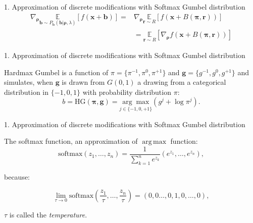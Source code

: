 \documentclass[10pt]{beamer}
\renewcommand{\vec}[1]{\mathbf{#1}}
\DeclareMathOperator*{\argmax}{arg\,max}
\begin{document}
\begin{frame}{1. Approximation of discrete modifications with Softmax Gumbel distribution}
    \begin{equation}
    \begin{aligned}
    \nabla_{\bm{\rho}} \underset{\vec{b}\sim P_\vec{b}\left(\vec{b} | \bm{\rho}, \lambda\right)}{\mathbb{E}}\left[f\left(\vec{x}+\vec{b}\right)\right] = 
    & \nabla_{\bm{\rho}} \underset{\vec{r} \sim R}{\mathbb{E}}[f(\vec{x}+B(\bm{\pi},\vec{r}))]  \\
    &  = \underset{\vec{r} \sim R}{\mathbb{E}}\left[ \nabla_{\bm{\rho}}  f(\vec{x}+B(\bm{\pi},\vec{r}))\right] 
    \label{eq:permutategradientexpectancy}
    \end{aligned}
    \end{equation}
\end{frame}

\begin{frame}{1. Approximation of discrete modifications with Softmax Gumbel distribution}

\begin{tcolorbox}[colback=lightgreen,colframe=greentheme,title=\textbf{Definition} (Hardmax Gumbel Function)]

Hardmax Gumbel is a function of  $\pi = \{\pi^{-1},\pi^{0}, \pi^{+1}\}$ and $\vec{g} = \{g^{-1},g^{0}, g^{+1}\}$ and simulates, when $\vec{g}$ is drawn from $G(0,1)$ a drawing from a categorical distribution in $\{-1,0,1\}$ with probability distribution $\pi$:  
    \begin{equation}
\label{eq:gumbel}
b = \mbox{HG}(\bm{\pi}, \vec{g}) = \underset{{j \in \{-1,0,+1\}}}{\arg \max} (g^j+ \log \pi^j).
\end{equation}
\end{tcolorbox}

\end{frame}

\begin{frame}{1. Approximation of discrete modifications with Softmax Gumbel distribution}
    
The softmax function, an approximation of $\argmax$ function:
$$ \mbox{softmax}\left(z_1,\ldots,z_n\right) = \frac{1}{\sum_{k=1}^n e^{z_k}}(e^{z_1},\ldots,e^{z_n}),$$

because: 

$$
\lim_{\tau \rightarrow 0} \mbox{softmax}\left(\frac{z_1}{\tau},\ldots,\frac{z_n}{\tau}\right) = (0,0\ldots,0,1,0,\dots, 0), 
$$

\pause
$\tau$ is called the \emph{temperature}.
\end{frame}
\end{document}
